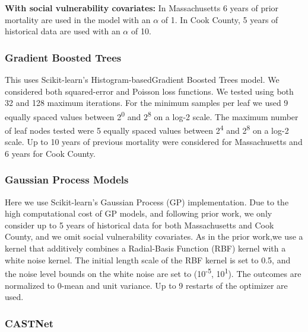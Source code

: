 \textbf{With social vulnerability covariates:} In Massachusetts 6 years of prior mortality are used in the model with an $\alpha$ of 1. In Cook County, 5 years of historical data are used with an $\alpha$ of 10.

\subsubsection{Gradient Boosted Trees}\label{gradient-boosted-trees}

This uses Scikit-learn's\citep{buitinckAPIDesignMachine2013} Histogram-basedGradient Boosted Trees model. We considered both squared-error and Poisson loss functions. We tested using both 32 and 128 maximum iterations. For the minimum samples per leaf we used 9 equally spaced values between 2\textsuperscript{0} and 2\textsuperscript{8} on a log-2 scale. The maximum number of leaf nodes tested were 5 equally spaced values between 2\textsuperscript{4} and 2\textsuperscript{8} on a log-2 scale. Up to 10 years of previous mortality were considered for Massachusetts and 6 years for Cook County.

\subsubsection{Gaussian Process Models}\label{gaussian-process-models}

Here we use Scikit-learn's\citep{buitinckAPIDesignMachine2013} Gaussian Process (GP) implementation. Due to the high computational cost of GP models, and following prior work\citep{allenTranslatingPredictiveAnalytics2023}, we only consider up to 5 years of historical data for both Massachusetts and Cook County, and we omit social vulnerability covariates. As in the prior work,we use a kernel that additively combines a Radial-Basis Function (RBF) kernel with a white noise kernel. The initial length scale of the RBF kernel is set to 0.5, and the noise level bounds on the white noise are set to (10\textsuperscript{-5}, 10\textsuperscript{1}). The outcomes are normalized to 0-mean and unit variance. Up to 9 restarts of the optimizer are used.

\subsubsection{CASTNet}\label{castnet}


